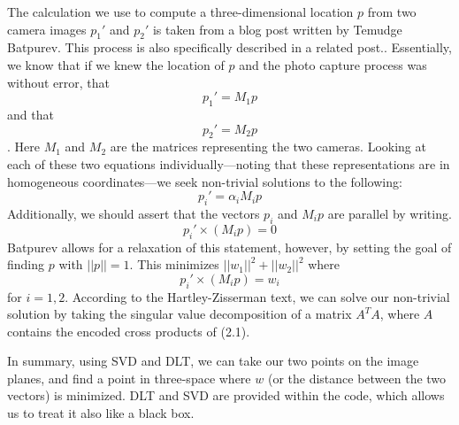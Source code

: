 \documentclass[
    12pt,
    twoside,
    bibstyle=chicago,
    headerstyle=uppercase,
	bibfile=biblatex_updating.bib
]{reedthesis}
\begin{document}
The calculation we use to compute a three-dimensional location $p$ from two camera images $p_1'$ and $p_2'$ is taken from a blog post written by Temudge Batpurev. \autocite{batpurevStereoCameraCalibration2021} This process is also specifically described in a related post.\autocite{batpurevDirectLinearTransforms2021}. Essentially, we know that if we knew the location of $p$ and the photo capture process was without error, that \[p_1'=M_1p\] and that \[p_2'=M_2p\]. Here $M_1$ and $M_2$ are the matrices representing the two cameras. Looking at each of these two equations individually---noting that these representations are in homogeneous coordinates---we seek non-trivial solutions to the following:\[p_i'=\alpha_iM_ip\]
Additionally, we should assert that the vectors $p_i$ and $M_ip$ are parallel by writing. \[p_i'\times(M_ip)=0\] Batpurev allows for a relaxation of this statement, however, by setting the goal of finding $p$ with $||p||=1$. This minimizes $||w_1||^2+||w_2||^2$ where
\begin{equation}
	p_i'\times (M_ip) = w_i
\end{equation}
for $i = 1,2$. According to the Hartley-Zisserman text, we can solve our non-trivial solution by taking the singular value decomposition of a matrix $A^TA$, where $A$ contains the encoded cross products of (2.1).

In summary, using SVD and DLT, we can take our two points on the image planes, and find a point in three-space where $w$ (or the distance between the two vectors) is minimized. DLT and SVD are provided within the code, which allows us to treat it also like a black box.


\end{document}
